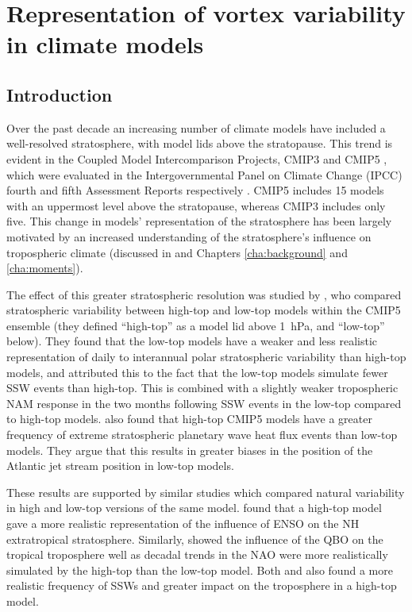 \chapter{Representation of vortex variability in climate models}
\label{cha:models}


\section{Introduction}
\label{sec:models_introduction}

Over the past decade an increasing number of climate models have included a
well-resolved stratosphere, with model lids above the stratopause. This trend is
evident in the Coupled Model Intercomparison Projects, CMIP3 and CMIP5
\citep{Cordero2006, Taylor2012}, which were evaluated in the Intergovernmental
Panel on Climate Change (IPCC) fourth and fifth Assessment Reports respectively
\citep{Solomon2007, Stocker2013}. CMIP5 includes 15 models with an uppermost
level above the stratopause, whereas CMIP3 includes only five. This change in
models' representation of the stratosphere has been largely motivated by an
increased understanding of the stratosphere's influence on tropospheric climate
(discussed in \citet{Gerber2012} and Chapters \ref{cha:background} and
\ref{cha:moments}).

The effect of this greater stratospheric resolution was studied by
\citet{Charlton-Perez2013}, who compared stratospheric variability between
high-top and low-top models within the CMIP5 ensemble (they defined ``high-top''
as a model lid above 1~hPa, and ``low-top'' below). They found that the low-top
models have a weaker and less realistic representation of daily to interannual
polar stratospheric variability than high-top models, and attributed this to the
fact that the low-top models simulate fewer SSW events than high-top. This is
combined with a slightly weaker tropospheric NAM response in the two months
following SSW events in the low-top compared to high-top
models. \citet{Shaw2014} also found that high-top CMIP5 models have a greater
frequency of extreme stratospheric planetary wave heat flux events than low-top
models. They argue that this results in greater biases in the position of the
Atlantic jet stream position in low-top models.

These results are supported by similar studies which compared natural
variability in high and low-top versions of the same model. \citet{Cagnazzo2009}
found that a high-top model gave a more realistic representation of the
influence of ENSO on the NH extratropical stratosphere. Similarly,
\citet{Hardiman2012a} showed the influence of the QBO on the tropical
troposphere well as decadal trends in the NAO were more realistically simulated
by the high-top than the low-top model. Both \citet{Sassi2010} and
\citet{Hardiman2012a} also found a more realistic frequency of SSWs and greater
impact on the troposphere in a high-top model.

